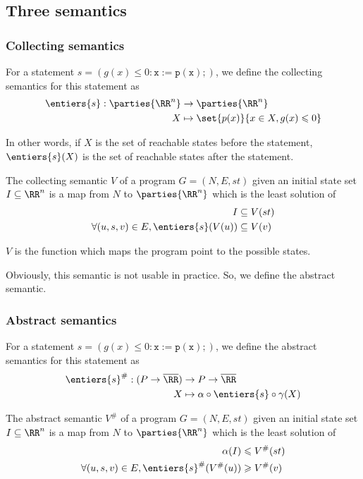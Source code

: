 \documentclass[a4paper, twoside, 10pt]{article}
\begin{document}
\subsection{Three semantics}


\subsubsection{Collecting semantics}

For a statement $s = (g(x) \leqslant 0: \mathtt{x := p(x);})$, we define the collecting semantics for this statement as
\[
    \begin{aligned}
        \entiers{s}:\parties{\RR^n} &\to \parties{\RR^n}\\
        X &\mapsto \set{p(x)}{x \in X, g(x) \leqslant 0}
    \end{aligned}
\]

In other words, if $X$ is the set of reachable states before the statement, $\entiers{s}(X)$ is the set of reachable states after the statement.

\bigskip

The collecting semantic $V$ of a program $G=(N,E,st)$ given an initial state set $I \subseteq\RR^n$ is a map from $N$ to $\parties{\RR^n}$ which is the least solution of
\[
    \begin{aligned}
        I &\subseteq V(st)\\
        \forall (u,s,v) \in E, \entiers{s}(V(u)) &\subseteq V(v)
    \end{aligned}
\]

$V$ is the function which maps the program point to the possible states.

Obviously, this semantic is not usable in practice. So, we define the abstract semantic.

\subsubsection{Abstract semantics}

For a statement $s = (g(x) \leqslant 0: \mathtt{x := p(x);})$, we define the abstract semantics for this statement as
\[
    \begin{aligned}
        \entiers{s}^\#: (P\to \overline{\RR}) &\to P\to \overline{\RR} \\
        X &\mapsto \alpha \circ \entiers{s} \circ \gamma(X)
    \end{aligned}
\]

The abstract semantic $V^\#$ of a program $G=(N,E,st)$ given an initial state set $I \subseteq\RR^n$ is a map from $N$ to $\parties{\RR^n}$ which is the least solution of
\[
    \begin{aligned}
        \alpha(I) &\leqslant V^\#(st)\\
        \forall (u,s,v) \in E, \entiers{s}^\#(V^\#(u)) &\geqslant V^\#(v)
    \end{aligned}
\]
\end{document}
